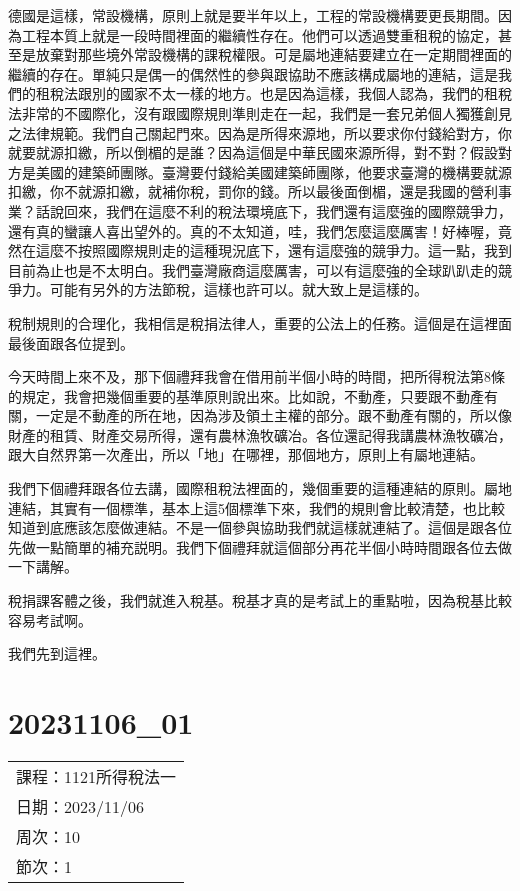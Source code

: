 \documentclass[]{ctexbook}
\begin{document}
德國是這樣，常設機構，原則上就是要半年以上，工程的常設機構要更長期間。因為工程本質上就是一段時間裡面的繼續性存在。他們可以透過雙重租稅的協定，甚至是放棄對那些境外常設機構的課稅權限。可是屬地連結要建立在一定期間裡面的繼續的存在。單純只是偶一的偶然性的參與跟協助不應該構成屬地的連結，這是我們的租稅法跟別的國家不太一樣的地方。也是因為這樣，我個人認為，我們的租稅法非常的不國際化，沒有跟國際規則準則走在一起，我們是一套兄弟個人獨獲創見之法律規範。我們自己關起門來。因為是所得來源地，所以要求你付錢給對方，你就要就源扣繳，所以倒楣的是誰？因為這個是中華民國來源所得，對不對？假設對方是美國的建築師團隊。臺灣要付錢給美國建築師團隊，他要求臺灣的機構要就源扣繳，你不就源扣繳，就補你稅，罰你的錢。所以最後面倒楣，還是我國的營利事業？話說回來，我們在這麼不利的稅法環境底下，我們還有這麼強的國際競爭力，還有真的蠻讓人喜出望外的。真的不太知道，哇，我們怎麼這麼厲害！好棒喔，竟然在這麼不按照國際規則走的這種現況底下，還有這麼強的競爭力。這一點，我到目前為止也是不太明白。我們臺灣廠商這麼厲害，可以有這麼強的全球趴趴走的競爭力。可能有另外的方法節稅，這樣也許可以。就大致上是這樣的。

稅制規則的合理化，我相信是稅捐法律人，重要的公法上的任務。這個是在這裡面最後面跟各位提到。

今天時間上來不及，那下個禮拜我會在借用前半個小時的時間，把所得稅法第8條的規定，我會把幾個重要的基準原則說出來。比如說，不動產，只要跟不動產有關，一定是不動產的所在地，因為涉及領土主權的部分。跟不動產有關的，所以像財產的租賃、財產交易所得，還有農林漁牧礦冶。各位還記得我講農林漁牧礦冶，跟大自然界第一次產出，所以「地」在哪裡，那個地方，原則上有屬地連結。

我們下個禮拜跟各位去講，國際租稅法裡面的，幾個重要的這種連結的原則。屬地連結，其實有一個標準，基本上這5個標準下來，我們的規則會比較清楚，也比較知道到底應該怎麼做連結。不是一個參與協助我們就這樣就連結了。這個是跟各位先做一點簡單的補充説明。我們下個禮拜就這個部分再花半個小時時間跟各位去做一下講解。

稅捐課客體之後，我們就進入稅基。稅基才真的是考試上的重點啦，因為稅基比較容易考試啊。

我們先到這裡。

\hypertarget{section-17}{%
\chapter{20231106\_01}\label{section-17}}

\begin{longtable}[]{@{}l@{}}
\toprule()
\endhead
課程：1121所得稅法一 \\
日期：2023/11/06 \\
周次：10 \\
節次：1 \\
\bottomrule()
\end{longtable}
\end{document}
